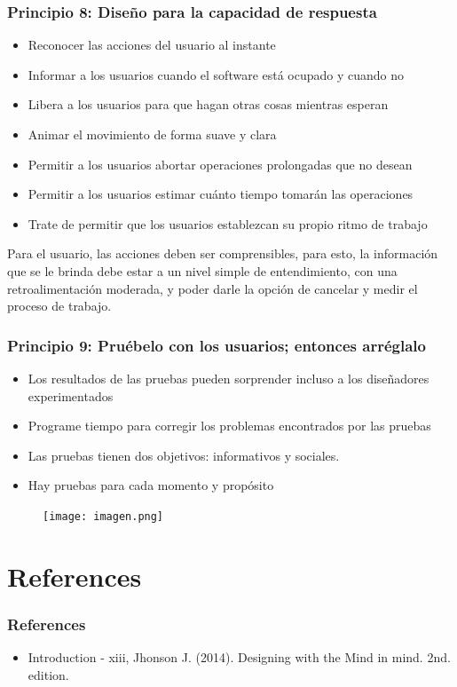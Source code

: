 \documentclass[11pt]{beamer}
\begin{document}
\begin{frame}
\frametitle{Principio 8: Diseño para la capacidad de respuesta}
    \par
    \justify
    \color{black}
    \begin{itemize}
    \item Reconocer las acciones del usuario al instante 
    \item Informar a los usuarios cuando el software está ocupado y cuando no 
    \item Libera a los usuarios para que hagan otras cosas mientras esperan 
    \item Animar el movimiento de forma suave y clara 
    \item Permitir a los usuarios abortar operaciones prolongadas que no desean
    \item Permitir a los usuarios estimar cuánto tiempo tomarán las operaciones
    \item Trate de permitir que los usuarios establezcan su propio ritmo de trabajo
    \end{itemize}
    \par
    \vspace{2mm}
    Para el usuario, las acciones deben ser comprensibles, para esto, la información que se le brinda debe estar a un nivel simple de entendimiento, con una retroalimentación moderada, y poder darle la opción de cancelar y medir el proceso de trabajo.
\end{frame}

\begin{frame}
\frametitle{Principio 9: Pruébelo con los usuarios; entonces arréglalo}
    \par
    \justify
    \color{black}
    \begin{itemize}
    \item Los resultados de las pruebas pueden sorprender incluso a los         diseñadores experimentados 
    \item Programe tiempo para corregir los problemas encontrados por las pruebas
    \item Las pruebas tienen dos objetivos: informativos y sociales.
    \item Hay pruebas para cada momento y propósito
    \end{itemize}
    \begin{figure}
    \centering
     \texttt{[image: imagen.png]} 
    \end{figure}
\end{frame}

\section{References}
\begin{frame}
\frametitle{References}
\begin{itemize}
\item Introduction - xiii, Jhonson J. (2014). Designing with the Mind in mind. 2nd. edition.
\end{itemize}
\end{frame}
\end{document}
